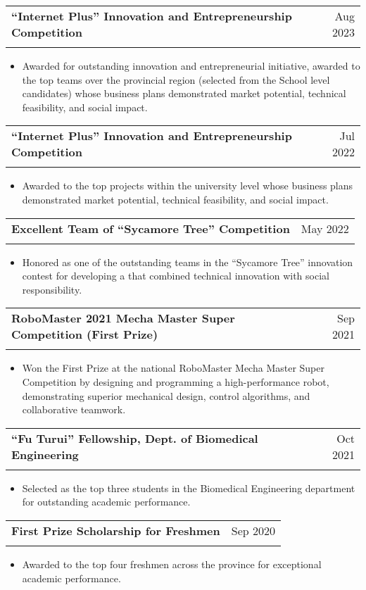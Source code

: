 \documentclass[letterpaper,11pt]{article}
\makeatletter
\newcommand{\resumeItem}[1]{
  \item\small{
    {#1 \vspace{-2pt}}
  }
}
\newcommand{\resumeSubheading}[4]{
  \vspace{-2pt}\item
    \begin{tabular*}{0.97\textwidth}[t]{l@{\extracolsep{\fill}}r}
      \textbf{#1} & #2 \\
      \textit{\small#3} & \textit{\small #4} \\
    \end{tabular*}\vspace{-7pt}
}
\newcommand{\resumeItemListStart}{\begin{itemize}}
\newcommand{\resumeItemListEnd}{\end{itemize}\vspace{-5pt}}
\makeatother
\begin{document}
\resumeSubheading
  {“Internet Plus” Innovation and Entrepreneurship Competition}
  {Aug 2023}
  {}
  {}
\vspace{-18pt}
\resumeItemListStart
  \resumeItem{Awarded for outstanding innovation and entrepreneurial initiative, awarded to the top teams over the provincial region (selected from the School level candidates) whose business plans demonstrated market potential, technical feasibility, and social impact.}
\resumeItemListEnd

\resumeSubheading
  {“Internet Plus” Innovation and Entrepreneurship Competition}
  {Jul 2022}
  {}
  {}
\vspace{-18pt}
\resumeItemListStart
  \resumeItem{Awarded to the top projects within the university level whose business plans demonstrated market potential, technical feasibility, and social impact.}
\resumeItemListEnd

\resumeSubheading
  {Excellent Team of “Sycamore Tree” Competition}
  {May 2022}
  {}
  {}
\vspace{-18pt}
\resumeItemListStart
  \resumeItem{Honored as one of the outstanding teams in the “Sycamore Tree”  innovation contest for developing a that combined technical innovation with social responsibility.}
\resumeItemListEnd

\resumeSubheading
  {RoboMaster 2021 Mecha Master Super Competition (First Prize)}
  {Sep 2021}
  {}
  {}
\vspace{-18pt}
\resumeItemListStart
  \resumeItem{Won the First Prize at the national RoboMaster Mecha Master Super Competition by designing and programming a high-performance robot, demonstrating superior mechanical design, control algorithms, and collaborative teamwork.}
\resumeItemListEnd

\resumeSubheading
  {“Fu Turui” Fellowship, Dept. of Biomedical Engineering}
  {Oct 2021}
  {}
  {}
\vspace{-18pt}
\resumeItemListStart
  \resumeItem{Selected as the top three students in the Biomedical Engineering department for outstanding academic performance.}
\resumeItemListEnd

\resumeSubheading
  {First Prize Scholarship for Freshmen}
  {Sep 2020}
  {}
  {}
\vspace{-18pt}
\resumeItemListStart
  \resumeItem{Awarded to the top four freshmen across the province for exceptional academic performance.}
\resumeItemListEnd
\end{document}
